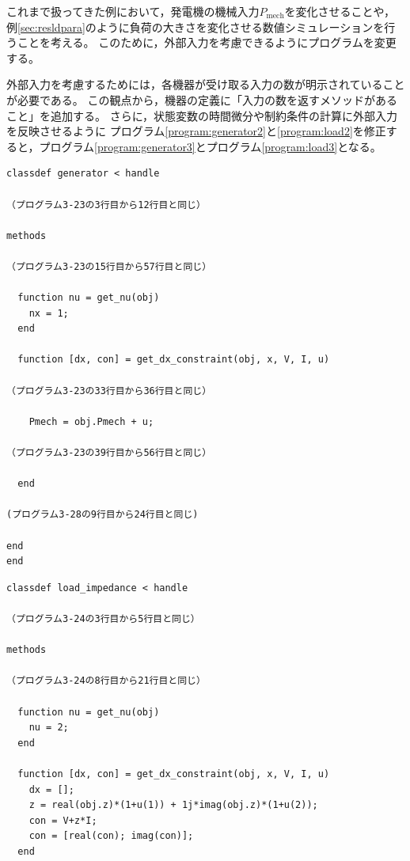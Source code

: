 \documentclass[tombow,dvipdfmx]{corona-a5-1.1}
\begin{document}
\begin{例}
これまで扱ってきた例において，発電機の機械入力$P_\mathrm{mech}$を変化させることや，例\ref{sec:resldpara}のように負荷の大きさを変化させる数値シミュレーションを行うことを考える。
このために，外部入力を考慮できるようにプログラムを変更する。

外部入力を考慮するためには，各機器が受け取る入力の数が明示されていることが必要である。
この観点から，機器の定義に「入力の数を返すメソッドがあること」を追加する。
さらに，状態変数の時間微分や制約条件の計算に外部入力を反映させるように
プログラム\ref{program:generator2}と\ref{program:load2}を修正すると，プログラム\ref{program:generator3}とプログラム\ref{program:load3}となる。

\smallskip
\begin{PROGRAMA}[count,title={generator.m}]\label{program:generator3}
  \begin{verbatim}
classdef generator < handle
  
（プログラム3-23の3行目から12行目と同じ）

methods

（プログラム3-23の15行目から57行目と同じ）

  function nu = get_nu(obj)
    nx = 1;
  end

  function [dx, con] = get_dx_constraint(obj, x, V, I, u)
    
（プログラム3-23の33行目から36行目と同じ）

    Pmech = obj.Pmech + u;

（プログラム3-23の39行目から56行目と同じ）

  end

(プログラム3-28の9行目から24行目と同じ)

end
end
\end{verbatim}
\end{PROGRAMA}

\begin{PROGRAMA}[count,title={load\_impedance.m}]\label{program:load3}
\begin{verbatim}
classdef load_impedance < handle
  
（プログラム3-24の3行目から5行目と同じ）

methods

（プログラム3-24の8行目から21行目と同じ）
  
  function nu = get_nu(obj)
    nu = 2;
  end

  function [dx, con] = get_dx_constraint(obj, x, V, I, u)
    dx = [];
    z = real(obj.z)*(1+u(1)) + 1j*imag(obj.z)*(1+u(2));
    con = V+z*I;
    con = [real(con); imag(con)];
  end


\end{verbatim}
\end{PROGRAMA}
\end{例}
\end{document}
